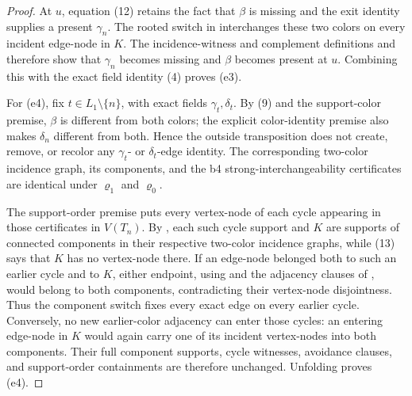 \begin{proof}
At \(u\), equation (12) retains the fact that \(\beta\) is missing and
the exit identity supplies a present \(\gamma_n\).  The rooted switch
in  interchanges these two colors on every
incident edge-node in \(K\).  The incidence-witness and complement
definitions  and  therefore
show that \(\gamma_n\) becomes missing and \(\beta\) becomes present at
\(u\).  Combining this with the exact field identity (4) proves (e3).

For (e4), fix \(t\in L_1\setminus\{n\}\), with exact fields
\(\gamma_t,\delta_t\).  By (9) and the support-color premise, \(\beta\)
is different from both colors; the explicit color-identity premise also
makes \(\delta_n\) different from both.  Hence the outside transposition
does not create, remove, or recolor any \(\gamma_t\)- or
\(\delta_t\)-edge identity.  The corresponding two-color incidence
graph, its components, and the b4 strong-interchangeability certificates
are identical under \(\varrho_1\) and \(\varrho_0\).

The support-order premise puts every vertex-node of each cycle appearing
in those certificates in \(V(T_n)\).  By
, each such cycle support and \(K\) are supports
of connected components in their respective two-color incidence graphs,
while (13) says that \(K\) has no
vertex-node there.  If an edge-node belonged both to such an earlier
cycle and to \(K\), either endpoint, using  and the
adjacency clauses of , would belong to both
components, contradicting their vertex-node disjointness.
Thus the component switch fixes every exact edge on every earlier cycle.
Conversely, no new earlier-color adjacency can enter those cycles:
an entering edge-node in \(K\) would again carry one of its incident
vertex-nodes into both components.  Their full component supports,
cycle witnesses, avoidance clauses, and support-order containments are
therefore unchanged.  Unfolding 
proves (e4).


\end{proof}
